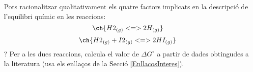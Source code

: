 \begin{exr}
Pots racionalitzar qualitativament els quatre factors implicats en la descripció de l'equilibri químic en les reaccions:
\[ \ch{H2_{(g)} <=> 2 H_{(g)}}\]
\[ \ch{H2_{(g)} + I2_{(g)} <=> 2 HI_{(g)}}\]?
Per a les dues reaccions, calcula el valor de $\Delta G^{\circ}$ a partir de dades obtingudes a la literatura (usa els enllaços de la Secció \ref{EnllacosInteres}).
\end{exr}